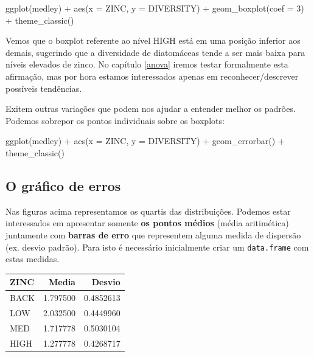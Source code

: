 \documentclass[
]{book}
\newenvironment{Shaded}{\begin{snugshade}}{\end{snugshade}}
\newcommand{\AttributeTok}[1]{\textcolor[rgb]{0.77,0.63,0.00}{#1}}
\newcommand{\DecValTok}[1]{\textcolor[rgb]{0.00,0.00,0.81}{#1}}
\newcommand{\FunctionTok}[1]{\textcolor[rgb]{0.00,0.00,0.00}{#1}}
\newcommand{\NormalTok}[1]{#1}
\newcommand{\SpecialCharTok}[1]{\textcolor[rgb]{0.00,0.00,0.00}{#1}}
\begin{document}
\begin{Shaded}
\begin{Highlighting}[]
\FunctionTok{ggplot}\NormalTok{(medley) }\SpecialCharTok{+}
  \FunctionTok{aes}\NormalTok{(}\AttributeTok{x =}\NormalTok{ ZINC, }\AttributeTok{y =}\NormalTok{ DIVERSITY) }\SpecialCharTok{+}
  \FunctionTok{geom\_boxplot}\NormalTok{(}\AttributeTok{coef =} \DecValTok{3}\NormalTok{) }\SpecialCharTok{+}
  \FunctionTok{theme\_classic}\NormalTok{()}
\end{Highlighting}
\end{Shaded}

Vemos que o boxplot referente ao nível HIGH está em uma posição inferior aos demais, sugerindo que a diversidade de diatomáceas tende a ser mais baixa para níveis elevados de zinco. No capítulo \ref{anova} iremos testar formalmente esta afirmação, mas por hora estamos interessados apenas em reconhecer/descrever possíveis tendências.

Exitem outras variações que podem nos ajudar a entender melhor os padrões. Podemos sobrepor os pontos individuais sobre os boxplots:

\begin{Shaded}
\begin{Highlighting}[]
\FunctionTok{ggplot}\NormalTok{(medley) }\SpecialCharTok{+}
  \FunctionTok{aes}\NormalTok{(}\AttributeTok{x =}\NormalTok{ ZINC, }\AttributeTok{y =}\NormalTok{ DIVERSITY) }\SpecialCharTok{+}
  \FunctionTok{geom\_errorbar}\NormalTok{() }\SpecialCharTok{+}
  \FunctionTok{theme\_classic}\NormalTok{()}
\end{Highlighting}
\end{Shaded}

\hypertarget{o-gruxe1fico-de-erros}{%
\subsection{O gráfico de erros}\label{o-gruxe1fico-de-erros}}

Nas figuras acima representamos os quartis das distribuições. Podemos estar interessados em apresentar somente \textbf{os pontos médios} (média aritimética) juntamente com \textbf{barras de erro} que representem alguma medida de dispersão (ex. desvio padrão). Para isto é necessário inicialmente criar um \texttt{data.frame} com estas medidas.

\begin{tabular}{l|r|r}
\hline
ZINC & Media & Desvio\\
\hline
BACK & 1.797500 & 0.4852613\\
\hline
LOW & 2.032500 & 0.4449960\\
\hline
MED & 1.717778 & 0.5030104\\
\hline
HIGH & 1.277778 & 0.4268717\\
\hline
\end{tabular}
\end{document}
